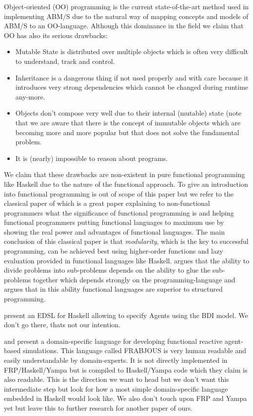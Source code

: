 Object-oriented (OO) programming is the current state-of-the-art method used in implementing ABM/S due to the natural way of mapping concepts and models of ABM/S to an OO-language. Although this dominance in the field we claim that OO has also its serious drawbacks:

\begin{itemize}
\item Mutable State is distributed over multiple objects which is often very difficult to understand, track and control.
\item Inheritance is a dangerous thing if not used properly and with care because it introduces very strong dependencies which cannot be changed during runtime any-more.
\item Objects don't compose very well due to their internal (mutable) state (note that we are aware that there is the concept of immutable objects which are becoming more and more popular but that does not solve the fundamental problem.
\item It is (nearly) impossible to reason about programs.
\end{itemize}

We claim that these drawbacks are non-existent in pure functional programming like Haskell due to the nature of the functional approach. To give an introduction into functional programming is out of scope of this paper but we refer to the classical paper of \cite{hughes_why_1989} which is a great paper explaining to non-functional programmers what the significance of functional programming is and helping functional programmers putting functional languages to maximum use by showing the real power and advantages of functional languages. The main conclusion of this classical paper is that \textit{modularity}, which is the key to successful programming, can be achieved best using higher-order functions and lazy evaluation provided in functional languages like Haskell. \cite{hughes_why_1989} argues that the ability to divide problems into sub-problems depends on the ability to glue the sub-problems together which depends strongly on the programming-language and \cite{hughes_why_1989} argues that in this ability functional languages are superior to structured programming.

\cite{sulzmann_specifying_2007} present an EDSL for Haskell allowing to specify Agents using the BDI model. We don't go there, thats not our intention. 

\cite{schneider_towards_2012} and \cite{vendrov_frabjous:_2014} present a domain-specific language for developing functional reactive agent-based simulations. This language called FRABJOUS is very human readable and easily understandable by domain-experts. It is not directly implemented in FRP/Haskell/Yampa but is compiled to Haskell/Yampa code which they claim is also readable. This is the direction we want to head but we don't want this intermediate step but look for how a most simple domain-specific language embedded in Haskell would look like. We also don't touch upon FRP and Yampa yet but leave this to further research for another paper of ours.

